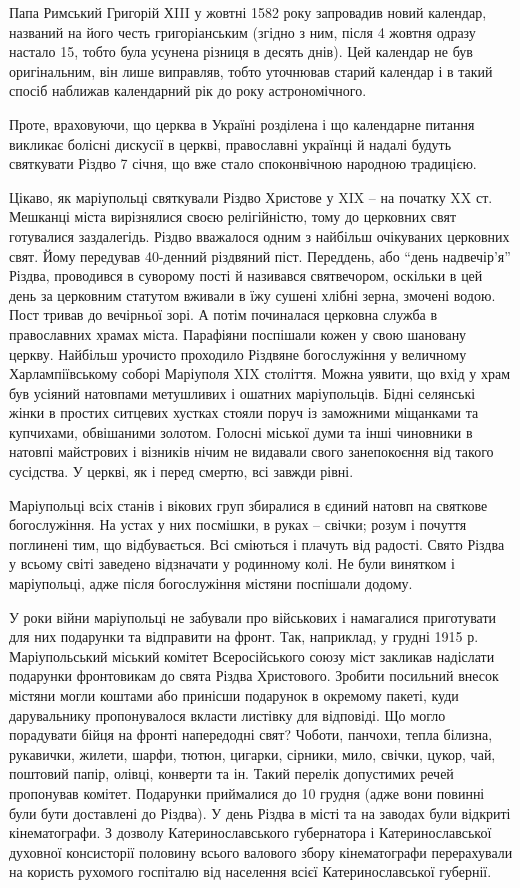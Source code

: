 Папа Римський Григорій ХIII у жовтні 1582 року запровадив новий календар,
названий на його честь григоріанським (згідно з ним, після 4 жовтня одразу
настало 15, тобто була усунена різниця в десять днів). Цей календар не був
оригінальним, він лише виправляв, тобто уточнював старий календар і в такий
спосіб наближав календарний рік до року астрономічного.

Проте, враховуючи, що церква в Україні розділена і що календарне питання
викликає болісні дискусії в церкві, православні українці й надалі будуть
святкувати Різдво 7 січня, що вже стало споконвічною народною традицією.

Цікаво, як маріупольці святкували Різдво Христове у XIX – на початку XX ст.
Мешканці міста вирізнялися своєю релігійністю, тому до церковних свят
готувалися заздалегідь. Різдво вважалося одним з найбільш очікуваних церковних
свят. Йому передував 40-денний різдвяний піст. Переддень, або \enquote{день надвечір'я}
Різдва, проводився в суворому пості й називався святвечором, оскільки в цей
день за церковним статутом вживали в їжу сушені хлібні зерна, змочені водою.
Пост тривав до вечірньої зорі. А потім починалася церковна служба в
православних храмах міста. Парафіяни поспішали кожен у свою шановану церкву.
Найбільш урочисто проходило Різдвяне богослужіння у величному Харлампіївському
соборі Маріуполя XIX століття. Можна уявити, що вхід у храм був усіяний
натовпами метушливих і ошатних маріупольців. Бідні селянські жінки в простих
ситцевих хустках стояли поруч із заможними міщанками та купчихами, обвішаними
золотом. Голосні міської думи та інші чиновники в натовпі майстрових і візників
нічим не видавали свого занепокоєння від такого сусідства. У церкві, як і перед
смертю, всі завжди рівні.

Маріупольці всіх станів і вікових груп збиралися в єдиний натовп на святкове
богослужіння. На устах у них посмішки, в руках – свічки; розум і почуття
поглинені тим, що відбувається. Всі сміються і плачуть від радості. Свято
Різдва у всьому світі заведено відзначати у родинному колі. Не були винятком і
маріупольці, адже після богослужіння містяни поспішали додому.

У роки війни маріупольці не забували про військових і намагалися приготувати
для них подарунки та відправити на фронт. Так, наприклад, у грудні 1915 р.
Маріупольський міський комітет Всеросійського союзу міст закликав надіслати
подарунки фронтовикам до свята Різдва Христового. Зробити посильний внесок
містяни могли коштами або принісши подарунок в окремому пакеті, куди
дарувальнику пропонувалося вкласти листівку для відповіді. Що могло порадувати
бійця на фронті напередодні свят? Чоботи, панчохи, тепла білизна, рукавички,
жилети, шарфи, тютюн, цигарки, сірники, мило, свічки, цукор, чай, поштовий
папір, олівці, конверти та ін. Такий перелік допустимих речей пропонував
комітет. Подарунки приймалися до 10 грудня (адже вони повинні були бути
доставлені до Різдва). У день Різдва в місті та на заводах були відкриті
кінематографи. З дозволу Катеринославського губернатора і Катеринославської
духовної консисторії половину всього валового збору кінематографи перерахували
на користь рухомого госпіталю від населення всієї Катеринославської губернії.

